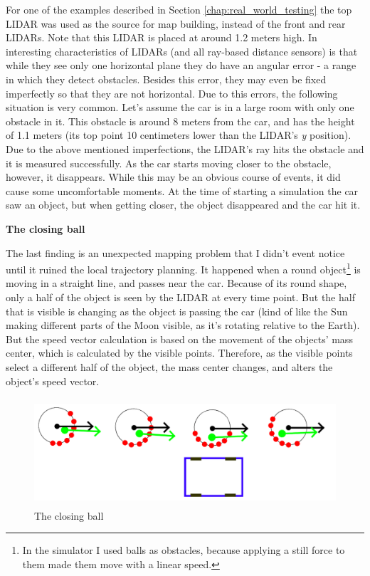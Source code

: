 For one of the examples described in Section \ref{chap:real_world_testing} the top LIDAR was used as the source for map building, instead of the front and rear LIDARs. Note that this LIDAR is placed at around 1.2 meters high. In interesting characteristics of LIDARs (and all ray-based distance sensors) is that while they see only one horizontal plane they do have an angular error - a range in which they detect obstacles. Besides this error, they may even be fixed imperfectly so that they are not horizontal. Due to this errors, the following situation is very common. Let's assume the car is in a large room with only one obstacle in it. This obstacle is around 8 meters from the car, and has the height of 1.1 meters (its top point 10 centimeters lower than the LIDAR's \textit{y} position). Due to the above mentioned imperfections, the LIDAR's ray hits the obstacle and it is measured successfully. As the car starts moving closer to the obstacle, however, it disappears. While this may be an obvious course of events, it did cause some uncomfortable moments. At the time of starting a simulation the car saw an object, but when getting closer, the object disappeared and the car hit it.

\textbf{The closing ball}

The last finding is an unexpected mapping problem that I didn't event notice until it ruined the local trajectory planning. It happened when a round object\footnote{In the simulator I used balls as obstacles, because applying a still force to them made them move with a linear speed.} is moving in a straight line, and passes near the car. Because of its round shape, only a half of the object is seen by the LIDAR at every time point. But the half that is visible is changing as the object is passing the car (kind of like the Sun making different parts of the Moon visible, as it's rotating relative to the Earth). But the speed vector calculation is based on the movement of the objects' mass center, which is calculated by the visible points. Therefore, as the visible points select a different half of the object, the mass center changes, and alters the object's speed vector.

\begin{figure}[!ht]
    \centering
    \includegraphics[height=40mm]{figures/raw/closing_ball.png}
    \caption{The closing ball}
    \label{closing_ball}
\end{figure} 

